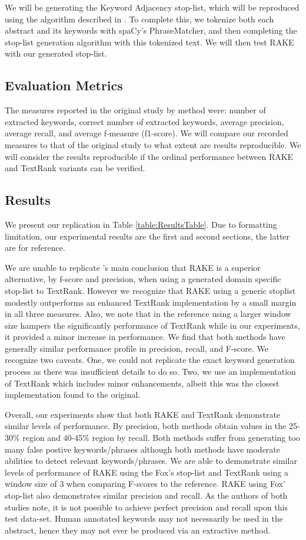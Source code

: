 \documentclass[11pt,a4paper]{article}
\begin{document}
We will be generating the Keyword Adjacency stop-list, which will be reproduced using the algorithm described in \citet{1}. To complete this, we tokenize both each abstract and its keywords with spaCy's PhraseMatcher, and then completing the stop-list generation algorithm with this tokenized text. We will then test RAKE with our generated stop-list. 

\subsection{Evaluation Metrics}

The measures reported in the original study by method were: number of extracted keywords, correct number of extracted keywords, average precision, average recall, and average f-measure (f1-score).  We will compare our recorded measures to that of the original study to what extent are  results reproducible. We will consider the results reproducible if the ordinal performance between RAKE and TextRank variants can be verified. 

\subsection{Results}

We present our replication in Table \ref{table:ResultsTable}. Due to formatting limitation, our experimental results are the first and second sections, the latter are for reference.

We are unable to replicate \citet{1}'s main conclusion that RAKE is a superior alternative, by f-score and precision, when using a generated domain specific stop-list to TextRank. However we recognize that RAKE using a generic stoplist modestly outperforms an enhanced TextRank implementation by a small margin in all three measures. Also, we note that in the reference using a larger window size hampers the significantly performance of TextRank while in our experiments, it provided a minor increase in performance. We find that both methods have generally similar performance profile in precision, recall, and F-score. We recognize two caveats. One, we could not replicate the exact keyword generation process as there was insufficient details to do so. Two, we use an implementation of TextRank which includes minor enhancements, albeit this was the closest implementation found to the original. 

Overall, our experiments show that both RAKE and TextRank demonstrate similar levels of performance. By precision, both methods obtain values in the 25-30\% region and 40-45\% region by recall. Both methods suffer from generating too many false postive keywords/phrases although both methods have moderate abilities to detect relevant keywords/phrases. We are able to demonstrate similar levels of performance of RAKE using the Fox's stop-list and TextRank using a window size of 3 when comparing F-scores to the reference. RAKE using Fox' stop-list also demonstrates similar precision and recall. As the authors of both studies note, it is not possible to achieve perfect precision and recall upon this test data-set. Human annotated keywords may not necessarily be used in the abstract, hence they may not ever be produced via an extractive method.
\end{document}
